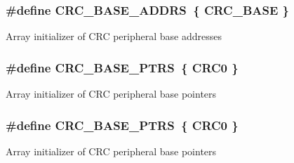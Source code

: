 \subsubsection[{\texorpdfstring{C\+R\+C\+\_\+\+B\+A\+S\+E\+\_\+\+A\+D\+D\+RS}{CRC_BASE_ADDRS}}]{\setlength{\rightskip}{0pt plus 5cm}\#define C\+R\+C\+\_\+\+B\+A\+S\+E\+\_\+\+A\+D\+D\+RS~\{ {\bf C\+R\+C\+\_\+\+B\+A\+SE} \}}\hypertarget{group__CRC__Peripheral__Access__Layer_ga588ae3592324fa73ed599a467515c05e}{}\label{group__CRC__Peripheral__Access__Layer_ga588ae3592324fa73ed599a467515c05e}
Array initializer of C\+RC peripheral base addresses 
\subsubsection[{\texorpdfstring{C\+R\+C\+\_\+\+B\+A\+S\+E\+\_\+\+P\+T\+RS}{CRC_BASE_PTRS}}]{\setlength{\rightskip}{0pt plus 5cm}\#define C\+R\+C\+\_\+\+B\+A\+S\+E\+\_\+\+P\+T\+RS~\{ {\bf C\+R\+C0} \}}\hypertarget{group__CRC__Peripheral__Access__Layer_ga0532d18a8549a09065845e5210ca6876}{}\label{group__CRC__Peripheral__Access__Layer_ga0532d18a8549a09065845e5210ca6876}
Array initializer of C\+RC peripheral base pointers 
\subsubsection[{\texorpdfstring{C\+R\+C\+\_\+\+B\+A\+S\+E\+\_\+\+P\+T\+RS}{CRC_BASE_PTRS}}]{\setlength{\rightskip}{0pt plus 5cm}\#define C\+R\+C\+\_\+\+B\+A\+S\+E\+\_\+\+P\+T\+RS~\{ {\bf C\+R\+C0} \}}\hypertarget{group__CRC__Peripheral__Access__Layer_ga0532d18a8549a09065845e5210ca6876}{}\label{group__CRC__Peripheral__Access__Layer_ga0532d18a8549a09065845e5210ca6876}
Array initializer of C\+RC peripheral base pointers 